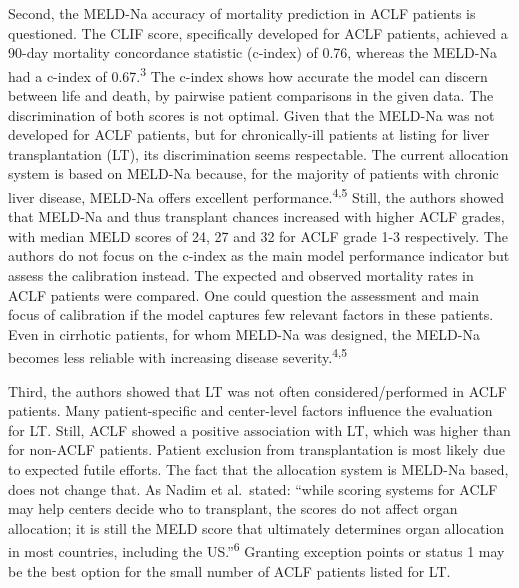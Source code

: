 \documentclass[11pt,english,]{book} %
\begin{document}
Second, the MELD-Na accuracy of mortality prediction in ACLF patients is questioned. The CLIF score, specifically developed for ACLF patients, achieved a 90-day mortality concordance statistic (c-index) of 0.76, whereas the MELD-Na had a c-index of 0.67.\textsuperscript{3} The c-index shows how accurate the model can discern between life and death, by pairwise patient comparisons in the given data. The discrimination of both scores is not optimal. Given that the MELD-Na was not developed for ACLF patients, but for chronically-ill patients at listing for liver transplantation (LT), its discrimination seems respectable. The current allocation system is based on MELD-Na because, for the majority of patients with chronic liver disease, MELD-Na offers excellent performance.\textsuperscript{4,5} Still, the authors showed that MELD-Na and thus transplant chances increased with higher ACLF grades, with median MELD scores of 24, 27 and 32 for ACLF grade 1-3 respectively. The authors do not focus on the c-index as the main model performance indicator but assess the calibration instead. The expected and observed mortality rates in ACLF patients were compared. One could question the assessment and main focus of calibration if the model captures few relevant factors in these patients. Even in cirrhotic patients, for whom MELD-Na was designed, the MELD-Na becomes less reliable with increasing disease severity.\textsuperscript{4,5}

Third, the authors showed that LT was not often considered/performed in ACLF patients. Many patient-specific and center-level factors influence the evaluation for LT. Still, ACLF showed a positive association with LT, which was higher than for non-ACLF patients. Patient exclusion from transplantation is most likely due to expected futile efforts. The fact that the allocation system is MELD-Na based, does not change that. As Nadim et al.~stated: ``while scoring systems for ACLF may help centers decide who to transplant, the scores do not affect organ allocation; it is still the MELD score that ultimately determines organ allocation in most countries, including the US.''\textsuperscript{6} Granting exception points or status 1 may be the best option for the small number of ACLF patients listed for LT.
\end{document}
